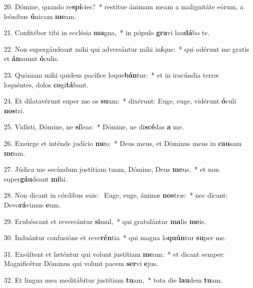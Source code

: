 20. Dómine, quando re\textbf{spí}cies?~*  restítue ánimam meam a malignitáte eórum, a leónibus \textbf{ú}nicam \textbf{me}am.\

21. Confitébor tibi in ecclésia \textbf{ma}gna,~*  in pópulo \textbf{gra}vi lau\textbf{dá}bo te.\

22. Non supergáudeant mihi qui adversántur mihi in\textbf{í}que:~*  qui odérunt me gratis et \textbf{án}nuunt \textbf{ó}culis.\

23. Quóniam mihi quidem pacífice loque\textbf{bán}tur:~*  et in iracúndia terræ loquéntes, dolos \textbf{co}gi\textbf{tá}bant.\

24. Et dilatavérunt super me os \textbf{su}um:~*  dixérunt: Euge, euge, vidérunt \textbf{ó}culi \textbf{nos}tri.\

25. Vidísti, Dómine, ne \textbf{sí}leas:~*  Dómine, ne di\textbf{scé}das \textbf{a} me.\

26. Exsúrge et inténde judício \textbf{me}o:~*  Deus meus, et Dóminus meus in \textbf{cau}sam \textbf{me}am.\

27. Júdica me secúndum justítiam tuam, Dómine, Deus \textbf{me}us,~*  et non super\textbf{gáu}deant \textbf{mi}hi.\

28. Non dicant in córdibus suis: \dag\  Euge, euge, ánimæ \textbf{nos}træ:~*  nec dicant: Devo\textbf{rá}vimus \textbf{e}um.\

29. Erubéscant et revereántur \textbf{si}mul,~*  qui gratulántur \textbf{ma}lis \textbf{me}is.\

30. Induántur confusióne et reve\textbf{rén}tia~*  qui magna lo\textbf{quún}tur \textbf{su}per me.\

31. Exsúltent et læténtur qui volunt justítiam \textbf{me}am:~*  et dicant semper: Magnificétur Dóminus qui volunt pacem \textbf{ser}vi \textbf{e}jus.\

32. Et lingua mea meditábitur justítiam \textbf{tu}am,~*  tota die \textbf{lau}dem \textbf{tu}am.\

